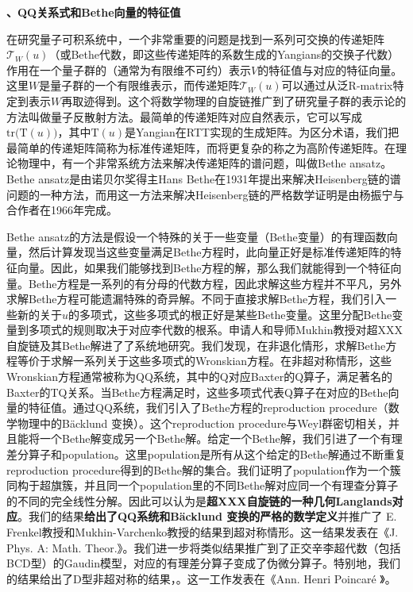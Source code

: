 \documentclass[12pt,UTF8,AutoFakeBold=4,a4paper]{ctexart}
\begin{document}
\medskip

\textbf{、QQ关系式和Bethe向量的特征值}

在研究量子可积系统中，一个非常重要的问题是找到一系列可交换的传递矩阵$\mathcal T_W(u)$（或Bethe代数，即这些传递矩阵的系数生成的Yangians的交换子代数）作用在一个量子群的（通常为有限维不可约）表示$V$的特征值与对应的特征向量。这里$W$是量子群的一个有限维表示，而传递矩阵$\mathcal T_W(u)$可以通过从泛R-matrix特定到表示$W$再取迹得到。这个将数学物理的自旋链推广到了研究量子群的表示论的方法叫做量子反散射方法。最简单的传递矩阵对应自然表示，它可以写成$\mathrm{tr}\big(\mathrm T(u)\big)$，其中$\mathrm T(u)$是Yangian在RTT实现的生成矩阵。为区分术语，我们把最简单的传递矩阵简称为标准传递矩阵，而将更复杂的称之为高阶传递矩阵。在理论物理中，有一个非常系统方法来解决传递矩阵的谱问题，叫做Bethe ansatz。Bethe ansatz是由诺贝尔奖得主Hans Bethe在1931年提出来解决Heisenberg链的谱问题的一种方法，而用这一方法来解决Heisenberg链的严格数学证明是由杨振宁与合作者在1966年完成。

Bethe ansatz的方法是假设一个特殊的关于一些变量（Bethe变量）的有理函数向量，然后计算发现当这些变量满足Bethe方程时，此向量正好是标准传递矩阵的特征向量。因此，如果我们能够找到Bethe方程的解，那么我们就能得到一个特征向量。Bethe方程是一系列的有分母的代数方程，因此求解这些方程并不平凡，另外求解Bethe方程可能遗漏特殊的奇异解。不同于直接求解Bethe方程，我们引入一些新的关于$u$的多项式，这些多项式的根正好是某些Bethe变量。这里分配Bethe变量到多项式的规则取决于对应李代数的根系。申请人和导师Mukhin教授对超XXX自旋链及其Bethe解进了了系统地研究。我们发现，在非退化情形，求解Bethe方程等价于求解一系列关于这些多项式的Wronskian方程。在非超对称情形，这些Wronskian方程通常被称为QQ系统，其中的Q对应Baxter的Q算子，满足著名的Baxter的TQ关系。当Bethe方程满足时，这些多项式代表Q算子在对应的Bethe向量的特征值。通过QQ系统，我们引入了Bethe方程的reproduction procedure（数学物理中的B\"{a}cklund 变换）。这个reproduction procedure与Weyl群密切相关，并且能将一个Bethe解变成另一个Bethe解。给定一个Bethe解，我们引进了一个有理差分算子和population。这里population是所有从这个给定的Bethe解通过不断重复reproduction procedure得到的Bethe解的集合。我们证明了population作为一个簇同构于超旗簇，并且同一个population里的不同Bethe解对应同一个有理查分算子的不同的完全线性分解。因此可以认为是\textbf{超XXX自旋链的一种几何Langlands对应}。我们的结果\textbf{给出了QQ系统和B\"{a}cklund 变换的严格的数学定义}并推广了 E. Frenkel教授和Mukhin-Varchenko教授的结果到超对称情形。这一结果发表在《J. Phys. A: Math. Theor.》。我们进一步将类似结果推广到了正交辛李超代数（包括BCD型）的Gaudin模型，对应的有理差分算子变成了伪微分算子。特别地，我们的结果给出了D型非超对称的结果，。这一工作发表在《Ann. Henri Poincaré 》。
\end{document}
